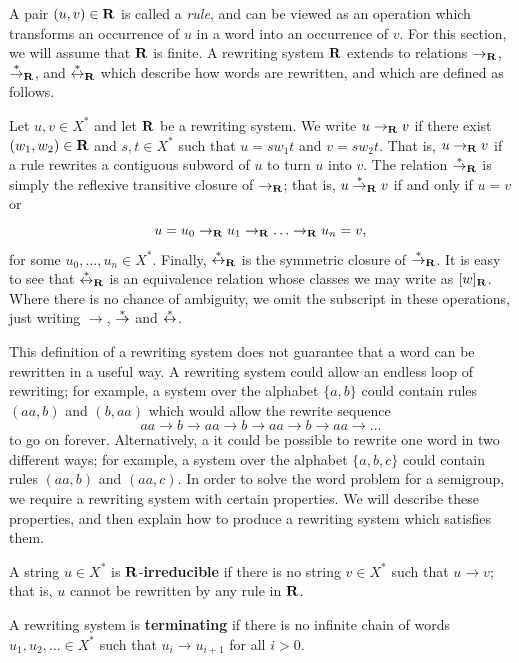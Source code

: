A pair $(u,v) \in \mathbf{R}$ is called a \textit{rule}, and can be viewed as
an operation which transforms an occurrence of $u$ in a word into an occurrence
of $v$.
For this section, we will assume that $\mathbf{R}$ is finite.
A rewriting system $\mathbf{R}$ extends to relations
$\to_{\mathbf{R}}$, $\stackrel{*}{\to}_{\mathbf{R}}$, and $\stackrel{*}{\leftrightarrow}_{\mathbf{R}}$
which describe how words are rewritten, and which are defined as follows.

Let $u, v \in X^*$ and let $\mathbf{R}$ be a rewriting system.
We write $u \to_{\mathbf{R}} v$ if there exist $(w_1, w_2) \in \mathbf{R}$ and
$s, t \in X^*$ such that $u=sw_1t$ and $v=sw_2t$.
That is, $u \to_{\mathbf{R}} v$ if a rule rewrites a contiguous subword of $u$ to turn
$u$ into $v$.  The relation $\stackrel{*}{\to}_{\mathbf{R}}$ is simply the reflexive transitive
closure of $\to_{\mathbf{R}}$; that is, $u \stackrel{*}{\to}_{\mathbf{R}} v$ if and only if $u = v$ or
$$u = u_0 \to_{\mathbf{R}} u_1 \to_{\mathbf{R}} \ldots \to_{\mathbf{R}} u_n = v,$$
for some $u_0, \ldots, u_n \in X^*$.
Finally, $\stackrel{*}{\leftrightarrow}_{\mathbf{R}}$ is the symmetric closure of
$\stackrel{*}{\to}_{\mathbf{R}}$.  It is easy to see that $\stackrel{*}{\leftrightarrow}_{\mathbf{R}}$ is an equivalence
relation whose classes we may write as $[w]_{\mathbf{R}}$.
Where there is no chance of ambiguity, we omit the subscript in these
operations, just writing $\to$, $\stackrel{*}{\to}$ and $\stackrel{*}{\leftrightarrow}$.

This definition of a rewriting system does not guarantee that a word can be
rewritten in a useful way.  A rewriting system could allow an endless loop of
rewriting; for example, a system over the alphabet $\{a,b\}$ could contain rules
$(aa,b)$ and $(b,aa)$ which would allow the rewrite sequence
$$aa \to b \to aa \to b \to aa \to b \to aa \to \ldots$$
to go on forever.  Alternatively, a it could be possible to rewrite one word in
two different ways; for example, a system over the alphabet $\{a,b,c\}$ could
contain rules $(aa,b)$ and $(aa,c)$.
In order to solve the word problem for a semigroup, we require a
rewriting system with certain properties.  We will describe these properties,
and then explain how to produce a rewriting system which satisfies them.

\begin{definition}
  A string $u \in X^*$ is $\mathbf{R}$-\textbf{irreducible} if there is no
  string $v \in X^*$ such that $u \to v$; that is, $u$ cannot be rewritten by
  any rule in $\mathbf{R}$.  \cite[Def~12.13]{cgt}
\end{definition}

\begin{definition}
  A rewriting system is \textbf{terminating} if there is no infinite chain of
  words $u_1, u_2, \ldots \in X^*$ such that $u_i \to u_{i+1}$ for all $i > 0$.
\end{definition}

